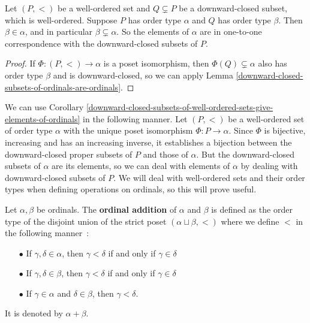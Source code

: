 \begin{corollary} \label{downward-closed-subsets-of-well-ordered-sets-give-elements-of-ordinals}
    Let $(P,<)$ be a well-ordered set and $Q \subsetneq P$ be a downward-closed subset, which is well-ordered. Suppose $P$ has order type $\alpha$ and $Q$ has order type $\beta$. Then $\beta \in \alpha$, and in particular $\beta \subsetneq \alpha$. So the elements of $\alpha$ are in one-to-one correspondence with the downward-closed subsets of $P$.
\end{corollary}

\begin{proof}
    If $\Phi : (P,<) \to \alpha$ is a poset isomorphism, then $\Phi(Q) \subsetneq \alpha$ also has order type $\beta$ and is downward-closed, so we can apply Lemma \autoref{downward-closed-subsets-of-ordinals-are-ordinals}.
\end{proof}

\begin{remark} \label{dealing-with-downward-closed-subsets}
    We can use Corollary \autoref{downward-closed-subsets-of-well-ordered-sets-give-elements-of-ordinals} in the following manner. Let $(P, <)$ be a well-ordered set of order type $\alpha$ with the unique poset isomorphism $\Phi : P \to \alpha$. Since $\Phi$ is bijective, increasing and has an increasing inverse, it establishes a bijection between the downward-closed proper subsets of $P$ and those of $\alpha$. But the downward-closed subsets of $\alpha$ are its elements, so we can deal with elements of $\alpha$ by dealing with downward-closed subsets of $P$. We will deal with well-ordered sets and their order types when defining operations on ordinals, so this will prove useful.
\end{remark}

\begin{definition} \label{ordinal-addition}
    Let $\alpha,\beta$ be ordinals. The \textbf{ordinal addition} of $\alpha$ and $\beta$ is defined as the order type of the disjoint union of the strict poset $(\alpha \sqcup \beta, <)$ where we define $<$ in the following manner~:
    \\
    \begin{itemize}
        \item[$\bullet$] If $\gamma,\delta \in \alpha$, then $\gamma < \delta$ if and only if $\gamma \in \delta$
        \\

        \item[$\bullet$] If $\gamma,\delta \in \beta$, then $\gamma < \delta$ if and only if $\gamma \in \delta$
        \\

        \item[$\bullet$] If $\gamma \in \alpha$ and $\delta \in \beta$, then $\gamma < \delta$. 
        \\

    \end{itemize}
    It is denoted by $\alpha + \beta$.
\end{definition}

